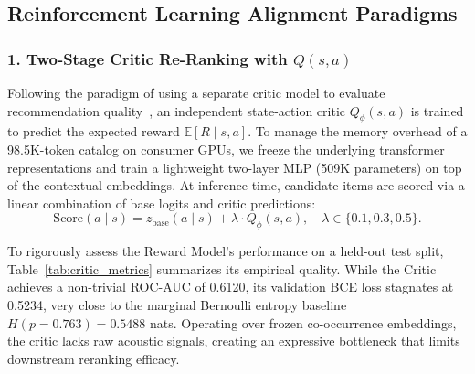 \subsection{Reinforcement Learning Alignment Paradigms}

\subsubsection{1. Two-Stage Critic Re-Ranking with $Q(s, a)$}
Following the paradigm of using a separate critic model to evaluate recommendation quality~\cite{petrov2024aligning}, an independent state-action critic $Q_\phi(s, a)$ is trained to predict the expected reward $\mathbb{E}[R \mid s, a]$. To manage the memory overhead of a 98.5K-token catalog on consumer GPUs, we freeze the underlying transformer representations and train a lightweight two-layer MLP (509K parameters) on top of the contextual embeddings. At inference time, candidate items are scored via a linear combination of base logits and critic predictions:
\begin{equation}
    \text{Score}(a \mid s) = z_{\text{base}}(a \mid s) + \lambda \cdot Q_\phi(s, a), \quad \lambda \in \{0.1, 0.3, 0.5\}.
\end{equation}

To rigorously assess the Reward Model's performance on a held-out test split, Table~\ref{tab:critic_metrics} summarizes its empirical quality. While the Critic achieves a non-trivial ROC-AUC of 0.6120, its validation BCE loss stagnates at 0.5234, very close to the marginal Bernoulli entropy baseline $H(p=0.763) = 0.5488$ nats. Operating over frozen co-occurrence embeddings, the critic lacks raw acoustic signals, creating an expressive bottleneck that limits downstream reranking efficacy.

\begin{table}[!htbp]
\centering
\caption{\textbf{Held-out validation quality metrics of the State-Action Critic $Q_\phi(s, a)$ (509K params).} The Critic stagnates near the marginal Bernoulli entropy baseline, exhibiting the representation bottleneck of frozen embeddings.}
\label{tab:critic_metrics}
\vspace{0.3em}
\end{table}

